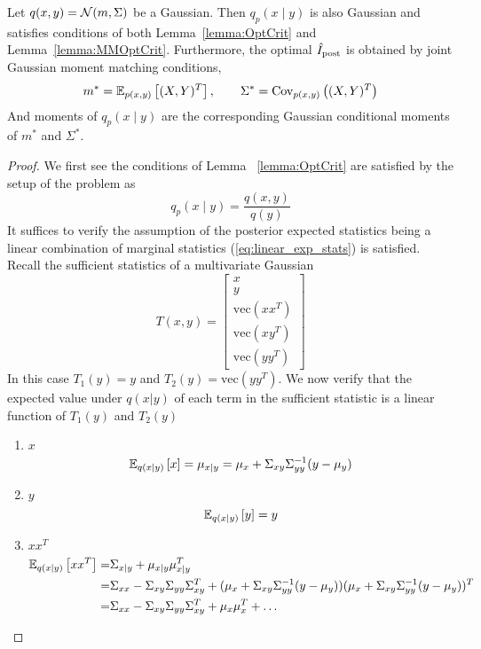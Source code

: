 \renewcommand\thetheorem{4.5}
\begin{corollary}
    Let $q(x, y) = \mathcal{N}(m, \Sigma)$ be a Gaussian. Then $q_p(x \mid y)$
    is also Gaussian and satisfies conditions of both
    Lemma~\ref{lemma:OptCrit} and Lemma~\ref{lemma:MMOptCrit}.
    Furthermore, the optimal $\hat{I}_{\text{post}}$ is obtained by joint Gaussian
    moment matching conditions,\vspace*{-2mm}
    \[
      m^* = \mathbb{E}_{p(x,y)}\left[ (X,Y)^T \right], \qquad \Sigma^* = \text{Cov}_{p(x,y)}\left((X,Y)^T\right)
    \]
    \vspace*{-3mm}And moments of $q_p(x \mid y)$ are the corresponding Gaussian conditional moments
    of $m^*$ and $\Sigma^*$.
  \end{corollary}
\begin{proof}
    We first see the conditions of Lemma ~\ref{lemma:OptCrit} are satisfied by the
    setup of the problem as 
    \[q_p(x \mid y)=\dfrac{q(x,y)}{q(y)}\]
    It suffices to verify the assumption of the posterior 
    expected statistics being a linear combination of marginal
    statistics (\EQN\eqref{eq:linear_exp_stats}) is satisfied.
    Recall the sufficient statistics of a multivariate Gaussian
    \[T(x,y)=\begin{bmatrix}
      x\\
      y\\
      \text{vec}(xx^T)\\
      \text{vec}(xy^T)\\
      \text{vec}(yy^T)
    \end{bmatrix}\]
    In this case $T_1(y)=y$ and $T_2(y)=\text{vec}(yy^T)$. We now
    verify that the expected value under $q(x|y)$ of each term in the
    sufficient statistic is a linear function of $T_1(y)$ and $T_2(y)$
    \begin{enumerate}
      \item $x$
      \[\mathbb{E}_{q(x|y)}\left[x\right]=\mu_{x|y}=\mu_x+\Sigma_{xy}\Sigma_{yy}^{-1}(y-\mu_y)\]
      \item $y$
      \[\mathbb{E}_{q(x|y)}\left[y\right]=y\]
      \item $xx^T$
      \begin{align*}
      \E_{q(x|y)}\left[xx^T\right]=&\Sigma_{x|y}+\mu_{x|y}\mu_{x|y}^T\\
      =&\Sigma_{xx}-\Sigma_{xy}\Sigma_{yy}\Sigma_{xy}^T+(\mu_x+\Sigma_{xy}\Sigma_{yy}^{-1}(y-\mu_y))(\mu_x+\Sigma_{xy}\Sigma_{yy}^{-1}(y-\mu_y))^T\\ 
      =&\Sigma_{xx}-\Sigma_{xy}\Sigma_{yy}\Sigma_{xy}^T+\mu_x\mu_x^T+\dots\\

\end{align*}
\end{enumerate}
\end{proof}
